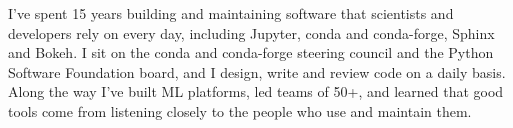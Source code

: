
\begin{cvparagraph}
I've spent 15 years building and maintaining software that scientists and developers rely on every day, including Jupyter, conda and conda-forge, Sphinx and Bokeh. I sit on the conda and conda-forge steering council and the Python Software Foundation board, and I design, write and review code on a daily basis. Along the way I've built ML platforms, led teams of 50+, and learned that good tools come from listening closely to the people who use and maintain them.
\end{cvparagraph}

